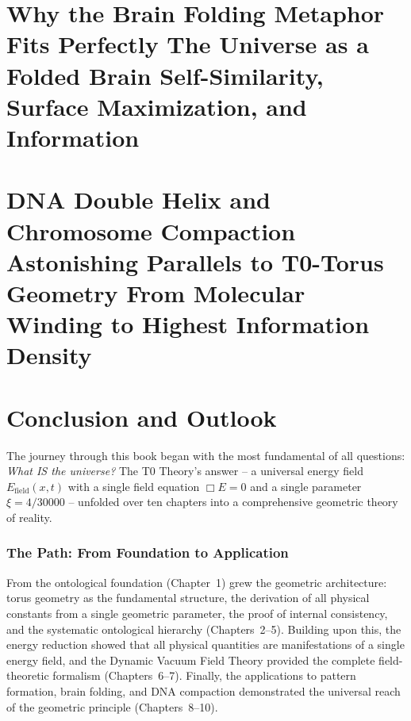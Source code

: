 \documentclass[11pt,oneside]{book}
\begin{document}
\chapter{Why the Brain Folding Metaphor Fits Perfectly The Universe as a Folded Brain Self-Similarity, Surface Maximization, and Information}


\chapter{DNA Double Helix and Chromosome Compaction Astonishing Parallels to T0-Torus Geometry From Molecular Winding to Highest Information Density}


\backmatter

\chapter*{Conclusion and Outlook}

The journey through this book began with the most fundamental of all questions: \textit{What IS the universe?} The T0 Theory's answer -- a universal energy field $E_{\text{field}}(x,t)$ with a single field equation $\Box E = 0$ and a single parameter $\xi = 4/30000$ -- unfolded over ten chapters into a comprehensive geometric theory of reality.

\subsection*{The Path: From Foundation to Application}

From the ontological foundation (Chapter~1) grew the geometric architecture: torus geometry as the fundamental structure, the derivation of all physical constants from a single geometric parameter, the proof of internal consistency, and the systematic ontological hierarchy (Chapters~2--5). Building upon this, the energy reduction showed that all physical quantities are manifestations of a single energy field, and the Dynamic Vacuum Field Theory provided the complete field-theoretic formalism (Chapters~6--7). Finally, the applications to pattern formation, brain folding, and DNA compaction demonstrated the universal reach of the geometric principle (Chapters~8--10).
\end{document}
